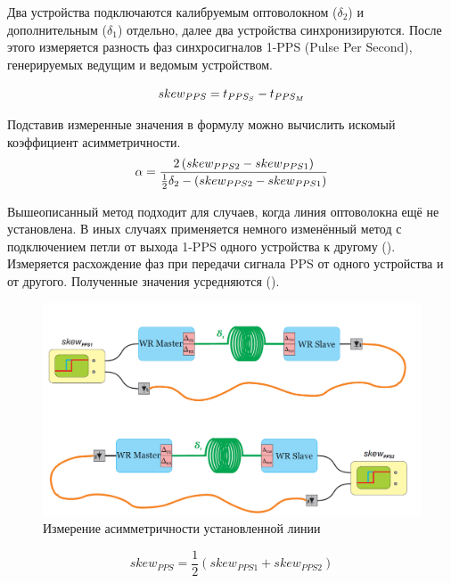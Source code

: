 Два устройства подключаются калибруемым оптоволокном ($\delta_{2}$) и дополнительным ($\delta_{1}$) отдельно, 
далее два устройства синхронизируются. После этого измеряется разность фаз синхросигналов 1-PPS
(Pulse Per Second), генерируемых ведущим и ведомым устройством. 

\begin{equation}
	skew_{PPS} = t_{PPS_S} - t_{PPS_M}\\
\end{equation}

Подставив измеренные значения в формулу  можно вычислить искомый коэффициент асимметричности.\\

\begin{equation}
	\label{eq:alpha}
	\alpha = \frac{2 \left( skew_{PPS2} - skew_{PPS1} \right) }{\frac{1}{2} \delta_2 - \left( skew_{PPS2} - skew_{PPS1} \right)}\\
\end{equation}

\bigbreak

Вышеописанный метод подходит для случаев, когда линия оптоволокна ещё не установлена.
В иных случаях применяется немного изменённый метод с подключением петли от выхода 1-PPS одного устройства к другому (). 
Измеряется расхождение фаз при передачи сигнала PPS от одного устройства и от другого. Полученные значения усредняются ().

\begin{figure}[ht!] 
	\center
	\includegraphics [scale=0.4] {my_folder/images//meas_scheme_2}
	\caption{Измерение асимметричности установленной линии} 
	\label{fig:meas-scheme-2}  
\end{figure}

\begin{equation}
	\label{eq:skew_mean}
	skew_{PPS} = \frac{1}{2} \left(skew_{PPS1} + skew_{PPS2} \right)
\end{equation}

